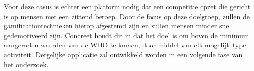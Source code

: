 Voor deze casus is echter een platform nodig dat een competitie opzet die gericht is op mensen met een zittend beroep. Door de focus op deze doelgroep, zullen de gamificationtechnieken hierop afgestemd zijn en zullen mensen minder snel gedemotiveerd zijn. Concreet houdt dit in dat het doel is om boven de minimum aangeraden waarden van de WHO te komen, door middel van elk mogelijk type activiteit. Dergelijke applicatie zal ontwikkeld worden in een volgende fase van het onderzoek.
